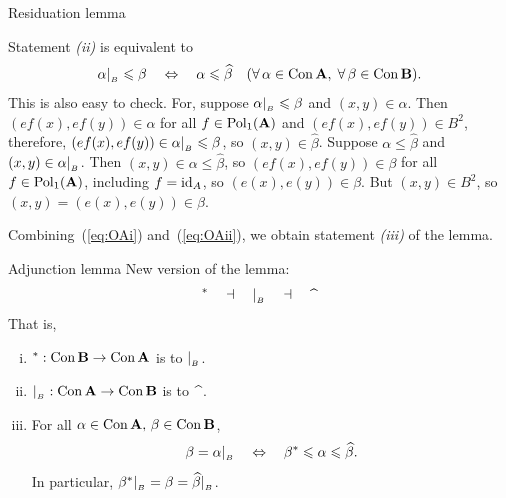 \begin{frame}[fragile,label=P5Lemma]{Residuation lemma}
{{Statement {\it (ii)} is equivalent to 
  \begin{equation}
    \label{eq:OAii}
    \alpha|_{_B}\leqslant \beta 
    \quad \Leftrightarrow \quad 
    \alpha \leqslant \widehat{\beta}
    \quad (\forall \, \alpha \in \mathrm{Con\,}\mathbf{A},\; \forall \, \beta \in \mathrm{Con\,}\mathbf{B}).
  \end{equation}
  This is also easy to check.  For, suppose
  $\alpha|_{_B}\leqslant \beta$ and $(x,y)\in \alpha$. Then $(ef(x), ef(y)) \in \alpha$
  for all $f \in \mathrm{Pol}_1(\mathbf{A})$ and $(ef(x), ef(y)) \in B^2$, therefore, 
  $(ef(x), ef(y)) \in \alpha|_{_B} \leqslant \beta$, so $(x,y) \in \widehat{\beta}$.
  Suppose $\alpha \leq \widehat{\beta}$ and $(x,y) \in \alpha|_{_B}$. 
  Then $(x,y) \in \alpha \leq  \widehat{\beta}$, so 
  $(ef(x), ef(y)) \in \beta$ for all $f\in \mathrm{Pol}_1(\mathbf{A})$, including $f=\mathrm{id}_A$, so 
  $(e(x), e(y)) \in \beta$. But $(x, y) \in B^2$, so $(x, y) = (e(x), e(y)) \in
  \beta$.

  Combining~(\ref{eq:OAi}) and~(\ref{eq:OAii}), we obtain statement {\it (iii)} of the lemma.}
}
\end{frame}

\begin{frame}[fragile,label=P5Lemma]{Adjunction lemma}
New version of the lemma:
\vskip2mm
{\Large 
\[^* \quad \dashv \quad \resB \quad \dashv \quad \hatmap\]
}
That is,
\begin{lemma} %
\label{lem:residuation-lemma}
  \begin{enumerate}[(i)]
  \item $^*: \mathrm{Con\,}\mathbf{B} \rightarrow \mathrm{Con\,}\mathbf{A}$ is  to $|_{_B}$.
  \item $|_{_B} : \mathrm{Con\,}\mathbf{A} \rightarrow \mathrm{Con\,}\mathbf{B}$ is  to $\hatmap$.
  \item For all $\alpha \in \mathrm{Con\,}\mathbf{A}, \, \beta \in \mathrm{Con\,}\mathbf{B}$,
    \[\beta = \alpha|_{_B} \quad \Leftrightarrow  \quad 
    \beta^* \leqslant \alpha \leqslant \widehat{\beta}.\]
    In particular, 
    $\beta^*|_{_B} = \beta = \widehat{\beta}|_{_B}$.
  \end{enumerate}
\end{lemma}
\end{frame}

